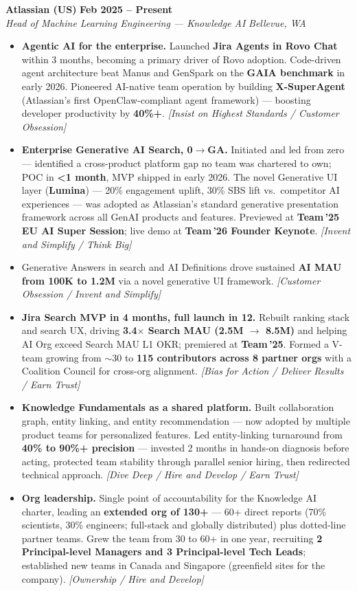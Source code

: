 \documentclass[10.5pt,letterpaper]{article}
\newcommand{\role}[4]{%
  \noindent\textbf{#1} \hfill \textbf{#3}\\
  \textit{#2} \hfill \textit{#4}\par\vspace{2pt}}
\newcommand{\lp}[1]{\textcolor{blue!55!black}{\small\textit{[#1]}}}
\begin{document}
\role{Atlassian (US)}{Head of Machine Learning Engineering --- Knowledge AI}{Feb 2025 -- Present}{Bellevue, WA}
\begin{itemize}
  \item \textbf{Agentic AI for the enterprise.} Launched \textbf{Jira Agents in Rovo Chat} within 3 months, becoming a primary driver of Rovo adoption. Code-driven agent architecture beat Manus and GenSpark on the \textbf{GAIA benchmark} in early 2026. Pioneered AI-native team operation by building \textbf{X-SuperAgent} (Atlassian's first OpenClaw-compliant agent framework) --- boosting developer productivity by \textbf{40\%+}. \lp{Insist on Highest Standards / Customer Obsession}
  \item \textbf{Enterprise Generative AI Search, 0$\to$GA.} Initiated and led from zero --- identified a cross-product platform gap no team was chartered to own; POC in \textbf{<1 month}, MVP shipped in early 2026. The novel Generative UI layer (\textbf{Lumina}) --- 20\% engagement uplift, 30\% SBS lift vs.\ competitor AI experiences --- was adopted as Atlassian's standard generative presentation framework across all GenAI products and features. Previewed at \textbf{Team\,'25 EU AI Super Session}; live demo at \textbf{Team\,'26 Founder Keynote}. \lp{Invent and Simplify / Think Big}
  \item Generative Answers in search and AI Definitions drove sustained \textbf{AI MAU from 100K to 1.2M} via a novel generative UI framework. \lp{Customer Obsession / Invent and Simplify}
  \item \textbf{Jira Search MVP in 4 months, full launch in 12.} Rebuilt ranking stack and search UX, driving \textbf{3.4$\times$ Search MAU (2.5M $\to$ 8.5M)} and helping AI Org exceed Search MAU L1 OKR; premiered at \textbf{Team\,'25}. Formed a V-team growing from $\sim$30 to \textbf{115 contributors across 8 partner orgs} with a Coalition Council for cross-org alignment. \lp{Bias for Action / Deliver Results / Earn Trust}
  \item \textbf{Knowledge Fundamentals as a shared platform.} Built collaboration graph, entity linking, and entity recommendation --- now adopted by multiple product teams for personalized features. Led entity-linking turnaround from \textbf{40\% to 90\%+ precision} --- invested 2 months in hands-on diagnosis before acting, protected team stability through parallel senior hiring, then redirected technical approach. \lp{Dive Deep / Hire and Develop / Earn Trust}
  \item \textbf{Org leadership.} Single point of accountability for the Knowledge AI charter, leading an \textbf{extended org of 130+} --- 60+ direct reports (70\% scientists, 30\% engineers; full-stack and globally distributed) plus dotted-line partner teams. Grew the team from 30 to 60+ in one year, recruiting \textbf{2 Principal-level Managers and 3 Principal-level Tech Leads}; established new teams in Canada and Singapore (greenfield sites for the company). \lp{Ownership / Hire and Develop}
\end{itemize}
\end{document}
